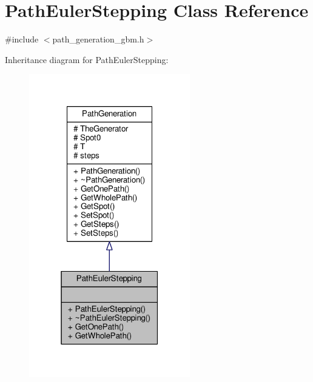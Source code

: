 \hypertarget{classPathEulerStepping}{}\section{Path\+Euler\+Stepping Class Reference}
\label{classPathEulerStepping}


{\ttfamily \#include $<$path\+\_\+generation\+\_\+gbm.\+h$>$}



Inheritance diagram for Path\+Euler\+Stepping\+:
\nopagebreak
\begin{figure}[H]
\begin{center}
\leavevmode
\includegraphics[width=199pt]{classPathEulerStepping__inherit__graph}
\end{center}
\end{figure}


